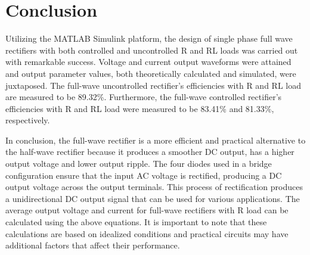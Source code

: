 


\pagebreak





\section{Conclusion}


\hspace{\parindent}

Utilizing the MATLAB Simulink platform, the design of single phase full wave rectifiers with both controlled and uncontrolled R and RL loads was carried out with remarkable success. Voltage and current output waveforms were attained and output parameter values, both theoretically calculated and simulated, were juxtaposed.
The full-wave uncontrolled rectifier's efficiencies with R and RL load are measured to be 89.32\%. Furthermore, the full-wave controlled rectifier's efficiencies with R and RL load were measured to be 83.41\% and 81.33\%, respectively.

In conclusion, the full-wave rectifier is a more efficient and practical alternative to the half-wave rectifier because it produces a smoother DC output, has a higher output voltage and lower output ripple. The four diodes used in a bridge configuration ensure that the input AC voltage is rectified, producing a DC output voltage across the output terminals.
This process of rectification produces a unidirectional DC output signal that can be used for various applications.
The average output voltage and current for full-wave rectifiers with R load can be calculated using the above equations. It is important to note that these calculations are based on idealized conditions and practical circuits may have additional factors that affect their performance.
\pagebreak